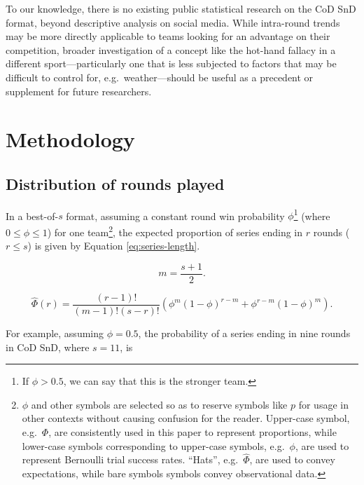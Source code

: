 \documentclass{article}
\begin{document}
To our knowledge, there is no existing public statistical research on
the CoD SnD format, beyond descriptive analysis on social media. While
intra-round trends may be more directly applicable to teams looking for
an advantage on their competition, broader investigation of a concept
like the hot-hand fallacy in a different sport---particularly one that
is less subjected to factors that may be difficult to control for,
e.g.~weather---should be useful as a precedent or supplement for future
researchers.

\hypertarget{methodology}{%
\section{Methodology}\label{methodology}}

\hypertarget{distribution-of-rounds-played}{%
\subsection{Distribution of rounds
played}\label{distribution-of-rounds-played}}

In a best-of-\(s\) format, assuming a constant round win probability
\(\phi\)\footnote{If \(\phi > 0.5\), we can say that this is the
  stronger team.} (where \(0 \leq \phi \leq 1\)) for one
team\footnote{\(\phi\) and other symbols are selected so as to reserve
  symbols like \(p\) for usage in other contexts without causing
  confusion for the reader. Upper-case symbol, e.g.~\(\Phi\), are
  consistently used in this paper to represent proportions, while
  lower-case symbols corresponding to upper-case symbols, e.g.~\(\phi\),
  are used to represent Bernoulli trial success rates. ``Hats'',
  e.g.~\(\hat{\Phi}\), are used to convey expectations, while bare
  symbols symbols convey observational data.}, the expected proportion
of series ending in \(r\) rounds (\(r \leq s\)) is given by Equation
\ref{eq:series-length}.

\begin{equation}\label{eq:m}
m = \frac{s + 1}{2}.
\end{equation}

\begin{equation}\label{eq:series-length}
\hat{\Phi}(r) = \frac{(r - 1)!}{(m - 1)!(s - r)!}(\phi^{m}(1 - \phi)^{r - m} + \phi^{r - m}(1 - \phi)^m).
\end{equation}

For example, assuming \(\phi = 0.5\), the probability of a series ending
in nine rounds in CoD SnD, where \(s=11\), is
\end{document}

